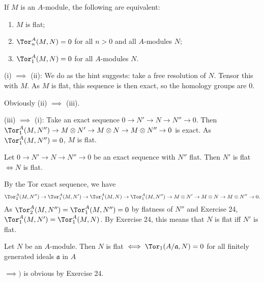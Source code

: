 \documentclass[a4paper]{exam}
\newif\ifhint
\begin{document}
\begin{questions}
	If $M $ is an $A $-module, the following are equivalent:
	\begin{enumerate}
		\item $M $ is flat;
		\item $\Tor^A_n(M,N) = 0 $ for all $n > 0 $ and all $A $-modules $N $;
		\item $\Tor_1^A(M,N) = 0 $ for all $A $-modules $N $.
	\end{enumerate}
	\ifhint
		To show that (i) $\implies $ (ii), take a free resolution of $N $ and tensor it with $M $. Since $M $ is flat, the resulting sequence is exact and therefore its homology groups, which are the $\Tor^A_n(M,N) $ are zero for $n > 0 $. To show that (iii) $\implies $ (i), let $0\to N' \to N \to N''\to 0 $ be an exact sequence. Then from the $\Tor $ exact sequence,
		\[
			\Tor_1(M,N'') \to M \otimes N' \to M \otimes N \to M \otimes N'' \to 0
		\]
		is exact. Since $\Tor_1(M,N'') = 0 $, it follows that $M $ is flat.
	\fi
	\begin{solution}
		(i) $\implies $ (ii):
		We do as the hint suggests: take a free resolution of $N $.
		Tensor this with $M $.
		As $M $ is flat, this sequence is then exact, so the homology groups are 0.

		Obviously (ii) $\implies $ (iii).

		(iii) $\implies $ (i):
		Take an exact sequence $0\to N' \to N \to N'' \to 0 $.
		Then $\Tor_1^A(M,N'') \to M \otimes N' \to M \otimes N \to M \otimes N'' \to 0 $ is exact.
		As $\Tor_1^A(M,N'') = 0 $, $M $ is flat.
	\end{solution}

	\question Let $0\to N'\to N\to N''\to 0 $ be an exact sequence with $N'' $ flat. Then $N' $ is flat $\iff N $ is flat.
	\ifhint
		Use Exercise 24 and the Tor exact sequence.
	\fi
	\begin{solution}
		By the Tor exact sequence, we have
		\[
			\Tor_2^A(M,N'') \to \Tor_1^A(M,N') \to \Tor_1^A(M,N) \to \Tor_1^A(M,N'') \to M \otimes  N' \to M \otimes N \to M \otimes N'' \to 0
		.\]
		As $\Tor_2^A(M,N'') = \Tor_1^A(M,N'') = 0 $ by flatness of $N'' $ and Exercise 24, $\Tor_1^A(M,N') = \Tor_1^A(M, N) $.
		By Exercise 24, this means that $N $ is flat iff $N' $ is flat.
	\end{solution}

	\question Let $N $ be an $A $-module. Then $N $ is flat $\iff \Tor_1(A / \mathfrak{a}, N) = 0 $ for all finitely generated ideals $\mathfrak{a}$ in $A $
	\ifhint
		Show first that $N$ is flat if $\Tor_1(M, N) = 0$ for all finitely generated $A$-modules $M$, by using (2.19). If $M$ is finitely generated, let $x_1, \cdots , x_n$ be a set of generators of $M$, and let $M$, be the submodule generated by $x_{1}, \ldots ,x_i$. By considering the successive quotients $M_i/M_{i-1}$ and using Exercise 25, deduce that $N$ is fiat if $\Tor_l(M, N) = 0$ for all cyclic $A$-modules $M$, i.e., all $M$ generated by a single element, and therefore of the form $A/\mathfrak{a}$ for some ideal $\mathfrak{a} $. Finally use (2.19) again to reduce to the case where $\mathfrak{a} $ is a finitely generated ideal.
		\fi
	\begin{solution}
		$\implies)$ is obvious by Exercise 24.


\end{solution}
\end{questions}
\end{document}
